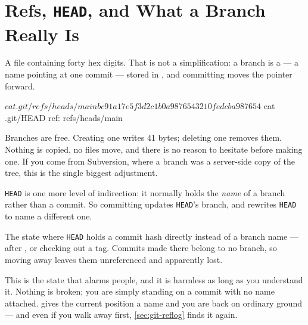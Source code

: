\section{Refs, \texorpdfstring{\texttt{HEAD}}{HEAD}, and What a Branch Really Is}\label{sec:git-refs}

\begin{definition}[Branch]
	A file containing forty hex digits. That is not a simplification: a branch is a
	 --- a name pointing at one commit --- stored in
	, and committing moves the pointer forward.
\end{definition}

\begin{shell}
$ cat .git/refs/heads/main
bc91a17e5f3d2c1b0a9876543210fedcba987654
$ cat .git/HEAD
ref: refs/heads/main
\end{shell}

\begin{moral}
	Branches are free. Creating one writes 41 bytes; deleting one removes them.
	Nothing is copied, no files move, and there is no reason to hesitate before
	making one. If you come from Subversion, where a branch was a server-side copy
	of the tree, this is the single biggest adjustment.
\end{moral}

\texttt{HEAD} is one more level of indirection: it normally holds the \emph{name}
of a branch rather than a commit. So committing updates \texttt{HEAD}'s branch,
and  rewrites \texttt{HEAD} to name a different one.

\begin{definition}
	The state where \texttt{HEAD} holds a commit hash directly instead of a branch
	name --- after , or checking out a tag. Commits made
	there belong to no branch, so moving away leaves them unreferenced and
	apparently lost.
\end{definition}

\begin{note}
	This is the state that alarms people, and it is harmless as long as you
	understand it. Nothing is broken; you are simply standing on a commit with no
	name attached.  gives the current position a name and
	you are back on ordinary ground --- and even if you walk away first,
	\autoref{sec:git-reflog} finds it again.
\end{note}

